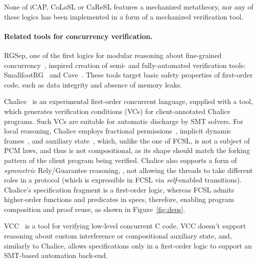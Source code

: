 None of iCAP, CoLoSL or CaReSL features a mechanized metatheory,
nor any of these logics has been implemented in a form of a mechanized
verification tool.


\paragraph{Related tools for concurrency verification.~~}
%
RGSep, one of the first logics for modular reasoning about
fine-grained concurrency~\cite{Vafeiadis-Parkinson:CONCUR07}, inspired
creation of semi- and fully-automated verification tools:
SmallfootRG~\cite{Calcagno-al:SAS07} and
Cave~\cite{Vafeiadis:VMCAI10}.
%
These tools target basic safety properties of first-order code,  such
as data integrity and absence of memory leaks.

Chalice~\cite{Leino-Muller:ESOP09} is an experimental first-order
concurrent language, supplied with a tool, which generates
verification conditions (VCs) for client-annotated Chalice
programs. Such VCs are suitable for automatic discharge by SMT
solvers.
%
%
%
For local reasoning, Chalice employs fractional
permissions~\cite{Bornat-al:POPL05}, implicit dynamic
frames~\cite{Smans-al:ECOOP09}, and auxiliary
state~\cite{Leino-al:FOSAD09}, which, unlike the one of FCSL, is not a
subject of PCM laws, and thus is not compositional, as its shape
should match the forking pattern of the client program being verified.
%
Chalice also supports a form of \emph{symmetric} Rely/Guarantee
reasoning, \ie, not allowing the threads to take different roles in a
protocol (which is expressible in FCSL via \emph{self}-enabled
transitions).
%
Chalice's specification fragment is a first-order logic, whereas FCSL
admits higher-order functions and predicates in specs, therefore,
enabling program composition and proof reuse, as shown in
Figure~\ref{fig:deps}.

VCC~\cite{Cohen-al:TPHOL09} is a tool for verifying low-level
concurrent C code. VCC doesn't support reasoning about custom
interference or compositional auxiliary state, and, similarly to
Chalice, allows specifications only in a first-order logic to support
an SMT-based automation back-end.

